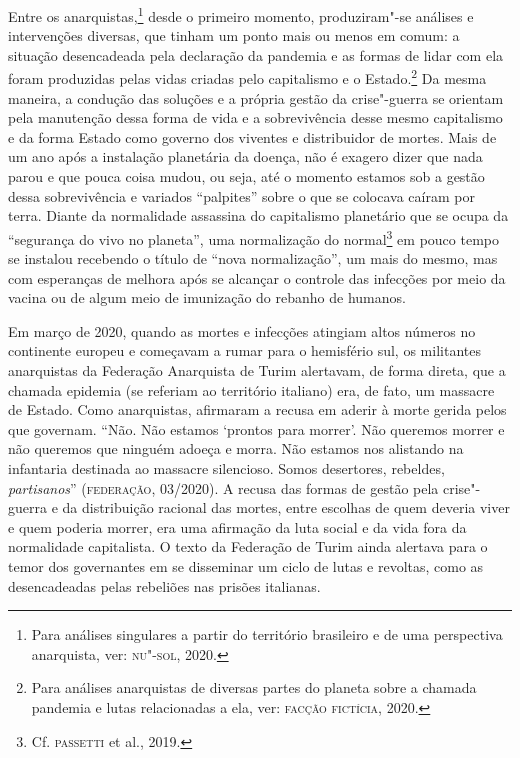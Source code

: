 Entre os anarquistas,\footnote{Para análises singulares a partir do
  território brasileiro e de uma perspectiva anarquista, ver: \textsc{nu}"-\textsc{sol},
  2020.} desde o primeiro momento, produziram"-se análises e intervenções
diversas, que tinham um ponto mais ou menos em comum: a situação
desencadeada pela declaração da pandemia e as formas de lidar com ela
foram produzidas pelas vidas criadas pelo capitalismo e o
Estado.\footnote{Para análises anarquistas de diversas partes do planeta
  sobre a chamada pandemia e lutas relacionadas a ela, ver: \textsc{facção}
  \textsc{fictícia}, 2020.} Da mesma maneira, a condução das soluções e a própria
gestão da crise"-guerra se orientam pela manutenção dessa forma de vida e
a sobrevivência desse mesmo capitalismo e da forma Estado como governo
dos viventes e distribuidor de mortes. Mais de um ano após a instalação
planetária da doença, não é exagero dizer que nada parou e que pouca
coisa mudou, ou seja, até o momento estamos sob a gestão dessa
sobrevivência e variados ``palpites'' sobre o que se colocava caíram por
terra. Diante da normalidade assassina do capitalismo planetário que se
ocupa da ``segurança do vivo no planeta'', uma normalização do
normal\footnote{Cf. \textsc{passetti} et al., 2019.} em pouco tempo se instalou
recebendo o título de ``nova normalização'', um mais do mesmo, mas com
esperanças de melhora após se alcançar o controle das infecções por meio
da vacina ou de algum meio de imunização do rebanho de humanos.

Em março de 2020, quando as mortes e infecções atingiam altos números no
continente europeu e começavam a rumar para o hemisfério sul, os
militantes anarquistas da Federação Anarquista de Turim alertavam, de
forma direta, que a chamada epidemia (se referiam ao território
italiano) era, de fato, um massacre de Estado. Como anarquistas,
afirmaram a recusa em aderir à morte gerida pelos que governam. ``Não.
Não estamos `prontos para morrer'. Não queremos morrer e não queremos
que ninguém adoeça e morra. Não estamos nos alistando na infantaria
destinada ao massacre silencioso. Somos desertores, rebeldes,
\emph{partisanos}'' (\textsc{federação}, 03/2020). A recusa das formas de gestão
pela crise"-guerra e da distribuição racional das mortes, entre escolhas
de quem deveria viver e quem poderia morrer, era uma afirmação da luta
social e da vida fora da normalidade capitalista. O texto da Federação
de Turim ainda alertava para o temor dos governantes em se disseminar um
ciclo de lutas e revoltas, como as desencadeadas pelas rebeliões nas
prisões italianas.

